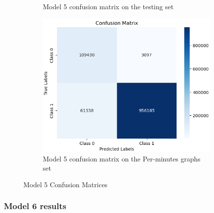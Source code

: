 \begin{figure}[H]
\begin{subfigure}{0.49\textwidth}
        \caption{Model 5 confusion matrix on the testing set}
    \label{fig:do_2_cm2}
    \end{subfigure}
    \begin{subfigure}{0.49\textwidth}
        \centering
        \includegraphics[width=\linewidth]{figures/ev/do_2_cm3.png}
        \caption{Model 5 confusion matrix on the Per-minutes graphs set}
    \label{fig:do_2_cm3}
    \end{subfigure}
    \captionsetup{font=large}
    \caption{Model 5 Confusion Matrices}
    \label{fig:5_cm}
\end{figure}

\subsubsection{Model 6 results}

